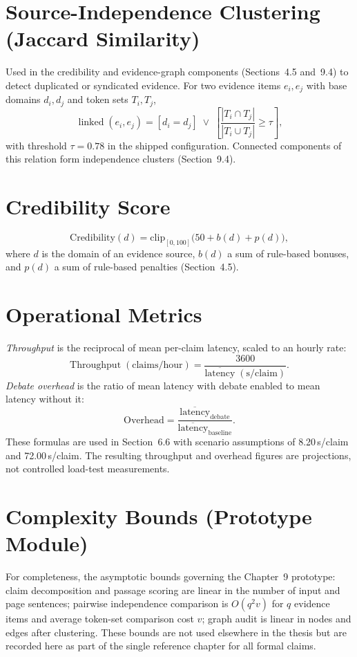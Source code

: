 \documentclass[12pt,a4paper,openany]{report}
\begin{document}
\section{Source-Independence Clustering (Jaccard Similarity)}
\label{sec:jaccard-def}
Used in the credibility and evidence-graph components (Sections~4.5 and~9.4) to detect duplicated or syndicated evidence. For two evidence items $e_i, e_j$ with base domains $d_i, d_j$ and token sets $T_i, T_j$,
\[
\operatorname{linked}(e_i,e_j) = [d_i = d_j] \;\lor\; \left[\frac{|T_i \cap T_j|}{|T_i \cup T_j|} \ge \tau\right],
\]
with threshold $\tau = 0.78$ in the shipped configuration. Connected components of this relation form independence clusters (Section~9.4).

\section{Credibility Score}
\label{sec:cred-def}
\[
\mathrm{Credibility}(d) = \mathrm{clip}_{[0,100]}\big(50 + b(d) + p(d)\big),
\]
where $d$ is the domain of an evidence source, $b(d)$ a sum of rule-based bonuses, and $p(d)$ a sum of rule-based penalties (Section~4.5).

\section{Operational Metrics}
\emph{Throughput} is the reciprocal of mean per-claim latency, scaled to an hourly rate:
\[
\mathrm{Throughput}\;(\mathrm{claims/hour}) = \frac{3600}{\overline{\mathrm{latency}}\;(\mathrm{s/claim})}.
\]
\emph{Debate overhead} is the ratio of mean latency with debate enabled to mean latency without it:
\[
\mathrm{Overhead} = \frac{\overline{\mathrm{latency}}_{\text{debate}}}{\overline{\mathrm{latency}}_{\text{baseline}}}.
\]
These formulas are used in Section~6.6 with scenario assumptions of 8.20\,s/claim and 72.00\,s/claim. The resulting throughput and overhead figures are projections, not controlled load-test measurements.

\section{Complexity Bounds (Prototype Module)}
For completeness, the asymptotic bounds governing the Chapter~9 prototype: claim decomposition and passage scoring are linear in the number of input and page sentences; pairwise independence comparison is $O(q^2v)$ for $q$ evidence items and average token-set comparison cost $v$; graph audit is linear in nodes and edges after clustering. These bounds are not used elsewhere in the thesis but are recorded here as part of the single reference chapter for all formal claims.
\end{document}
